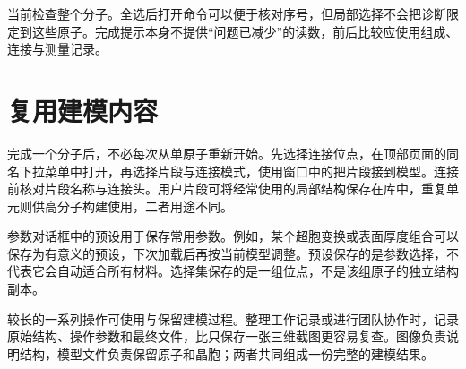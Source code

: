 当前检查整个分子。全选后打开命令可以便于核对序号，但局部选择不会把诊断限定到这些原子。完成提示本身不提供“问题已减少”的读数，前后比较应使用组成、连接与测量记录。


\section{复用建模内容}

完成一个分子后，不必每次从单原子重新开始。先选择连接位点，在顶部页面的同名下拉菜单中打开，再选择片段与连接模式，使用窗口中的把片段接到模型。连接前核对片段名称与连接头。用户片段可将经常使用的局部结构保存在库中，重复单元则供高分子构建使用，二者用途不同。

参数对话框中的预设用于保存常用参数。例如，某个超胞变换或表面厚度组合可以保存为有意义的预设，下次加载后再按当前模型调整。预设保存的是参数选择，不代表它会自动适合所有材料。选择集保存的是一组位点，不是该组原子的独立结构副本。

较长的一系列操作可使用与保留建模过程。整理工作记录或进行团队协作时，记录原始结构、操作参数和最终文件，比只保存一张三维截图更容易复查。图像负责说明结构，模型文件负责保留原子和晶胞；两者共同组成一份完整的建模结果。
